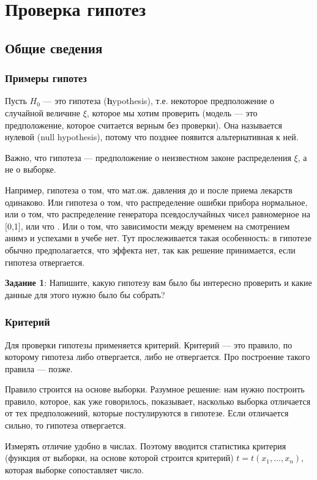 
\chapter{Проверка гипотез}

\section{Общие сведения}

\subsection{Примеры гипотез}
Пусть $H_0$ --- это гипотеза (\textbf{h}ypothesis), т.е. некоторое предположение о случайной величине $\xi$, которое мы хотим проверить (модель --- это предположение, которое считается верным без проверки).
Она называется нулевой (null hypothesis), потому что позднее появится альтернативная к ней.

Важно, что гипотеза --- предположение о неизвестном законе распределения $\xi$, а не о выборке.

Например, гипотеза о том, что мат.ож. давления до и после приема лекарств одинаково. Или гипотеза о том, что распределение ошибки прибора нормальное, или о том, что распределение генератора псевдослучайных чисел равномерное на [0,1], или что . Или о том, что зависимости между временем на смотрением анимэ и успехами в учебе нет. Тут прослеживается такая особенность: в гипотезе обычно предполагается, что эффекта нет, так как решение принимается, если гипотеза отвергается.

\textbf{Задание 1}: Напишите, какую гипотезу вам было бы интересно проверить и какие данные для этого нужно было бы собрать?

\subsection{Критерий}
Для проверки гипотезы применяется критерий. Критерий --- это правило, по которому гипотеза либо отвергается, либо не отвергается. Про построение такого правила --- позже.

Правило строится на основе выборки. Разумное решение:
нам нужно построить правило, которое, как уже говорилось, показывает, насколько выборка отличается от тех предположений, которые постулируются в гипотезе. Если отличается сильно, то гипотеза отвергается.

Измерять отличие удобно в числах.
Поэтому вводится статистика критерия (функция от выборки, на основе которой строится критерий) $t=t(x_1,\ldots,x_n)$, которая выборке сопоставляет число.

